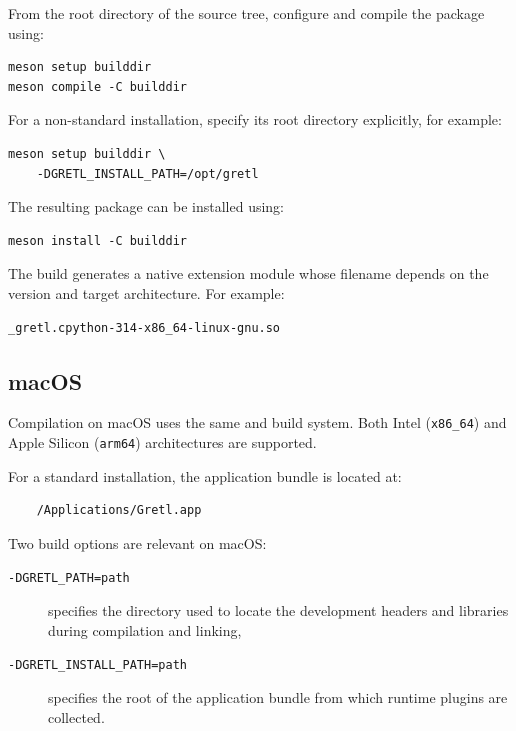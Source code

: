 From the root directory of the \gretlpy source tree,
configure and compile the package using:

\begin{verbatim}
meson setup builddir
meson compile -C builddir
\end{verbatim}

For a non-standard \gretl installation, specify its root
directory explicitly, for example:

\begin{verbatim}
meson setup builddir \
	-DGRETL_INSTALL_PATH=/opt/gretl
\end{verbatim}

The resulting package can be installed using:

\begin{verbatim}
meson install -C builddir
\end{verbatim}

The build generates a native \python extension module whose
filename depends on the \python version and target architecture.
For example:

\begin{verbatim}
_gretl.cpython-314-x86_64-linux-gnu.so
\end{verbatim}


\subsection{macOS}\label{sec:macos-compile}
Compilation on macOS uses the same  and 
build system. Both Intel (\texttt{x86\_64}) and Apple Silicon
(\texttt{arm64}) architectures are supported.

For a standard \gretl installation, the application bundle is
located at:

\begin{verbatim}
	/Applications/Gretl.app
\end{verbatim}

Two build options are relevant on macOS:

\begin{description}
	\item[\texttt{-DGRETL\_PATH=path}] specifies the
		directory used to locate the \gretl development
		headers and libraries during compilation and linking,
	\item[\texttt{-DGRETL\_INSTALL\_PATH=path}] specifies
		the root of the \gretl application bundle from
		which runtime plugins are collected.
\end{description}

